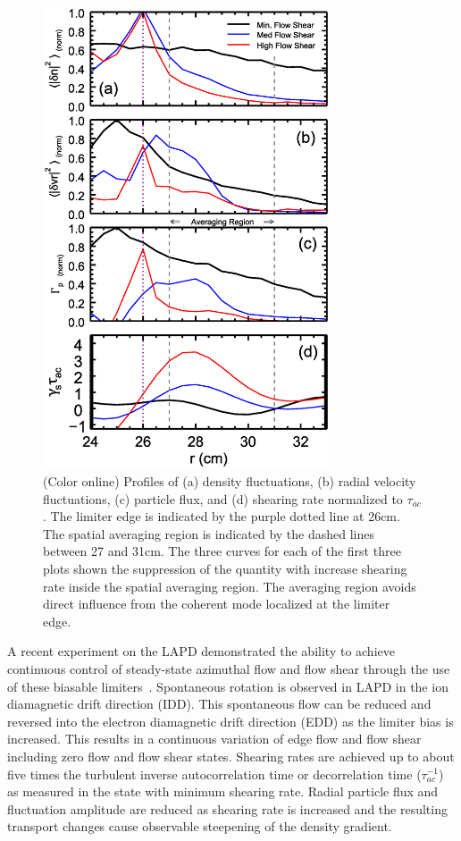 \documentclass[aip,pop,amsmath,amssymb,preprint,superscriptaddress]{revtex4-1} %
\begin{document}
\begin{figure}[!htbp]
\centerline{
\includegraphics[width=8.5cm]{figure3.eps}}
\caption{\label{fig:profiles} (Color online) Profiles of (a) density fluctuations, (b) radial velocity fluctuations, (c) particle flux, and (d) shearing rate normalized to $\tau_{ac}$. The limiter edge is indicated by the purple dotted line at 26cm. The spatial averaging region is indicated by the dashed lines between 27 and 31cm. The three curves for each of the first three plots shown the suppression of the quantity with increase shearing rate inside the spatial averaging region. The averaging region avoids direct influence from the coherent mode localized at the limiter edge.}
\end{figure}

A recent experiment on the LAPD demonstrated the ability to achieve
continuous control of steady-state azimuthal flow and flow shear
through the use of these biasable
limiters~\cite{schaffner12}. Spontaneous rotation is observed in LAPD
in the ion diamagnetic drift direction (IDD).  This spontaneous flow can be
reduced and reversed into the electron diamagnetic drift direction (EDD) as the
limiter bias is increased. This results in a continuous variation of
edge flow and flow shear including zero flow and flow shear
states. Shearing rates are achieved up to about five times the
turbulent inverse autocorrelation time or decorrelation time
($\tau_{ac}^{-1}$) as measured
in the state with minimum shearing rate. Radial particle flux and
fluctuation amplitude are reduced as shearing rate is increased and
the resulting transport changes cause observable steepening of the
density gradient.
\end{document}
